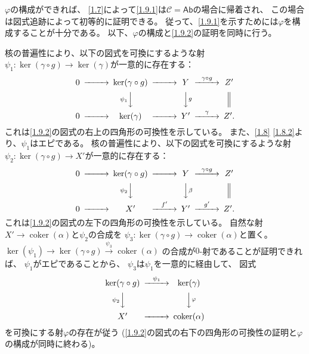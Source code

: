 \documentclass[uplatex,dvipdfmx]{jsarticle}
\makeatletter
\theoremstyle{definition}
\renewenvironment{proof}[1][\proofname]{
  \pushQED{\qed}%
  \normalfont \topsep6\p@\@plus6\p@\relax
  \trivlist
  \item[\hskip\labelsep
    #1\@addpunct{\textbf{.}}]\ignorespaces
}{%
  \popQED\endtrivlist\@endpefalse
}
\providecommand{\proofname}{証明}
\DeclareMathOperator{\coker}{\mathrm{coker}}
\newcommand{\Ab}{\mathsf{Ab}}
\newcommand\mcC{\mathcal{C}}
\makeatother
\begin{document}
\begin{proof}
  \(\varphi\)の構成ができれば、
  \autoref{1.7}によって\ref{1.9.1}は\(\mcC=\Ab\)の場合に帰着され、
  この場合は図式追跡によって初等的に証明できる。
  従って、\ref{1.9.1}を示すためには\(\varphi\)を構成することが十分である。
  以下、\(\varphi\)の構成と\ref{1.9.2}の証明を同時に行う。

  核の普遍性により、以下の図式を可換にするような射
  \(\psi_1:\ker(\gamma \circ g) \to \ker(\gamma)\)が一意的に存在する：
  \[
  \begin{CD}
    0 @>>> \ker(\gamma\circ g) @>>> Y @> \gamma\circ g >> Z' \\
    @. @V \psi_1 VV @VV g V @| \\
    0 @>>> \ker(\gamma) @>>> Y' @> \gamma >> Z'.
  \end{CD}
  \]
  これは\ref{1.9.2}の図式の右上の四角形の可換性を示している。
  また、\autoref{1.8} \ref{1.8.2}より、\(\psi_1\)はエピである。
  核の普遍性により、以下の図式を可換にするような射
  \(\psi_2:\ker(\gamma\circ g) \to X'\)が一意的に存在する：
  \[
  \begin{CD}
    0 @>>> \ker(\gamma\circ g) @>>> Y @> \gamma\circ g >> Z' \\
    @. @V \psi_2 VV @VV \beta V @| \\
    0 @>>> X' @> f' >> Y' @> g' >> Z'.
  \end{CD}
  \]
  これは\ref{1.9.2}の図式の左下の四角形の可換性を示している。
  自然な射\(X'\to \coker(\alpha)\)と\(\psi_2\)の合成を
  \(\psi_3:\ker(\gamma\circ g) \to \coker(\alpha)\)と置く。
  \(\ker(\psi_1) \to \ker(\gamma\circ g) \xrightarrow{\psi_3} \coker(\alpha)\)
  の合成が\(0\)-射であることが証明できれば、
  \(\psi_1\)がエピであることから、
  \(\psi_3\)は\(\psi_1\)を一意的に経由して、
  図式
  \[
  \begin{CD}
    \ker(\gamma\circ g) @> \psi_1 >> \ker(\gamma) \\
    @V \psi_2 VV @VV \varphi V \\
    X' @>>> \coker(\alpha)
  \end{CD}
  \]
  を可換にする射\(\varphi\)の存在が従う
  (\ref{1.9.2}の図式の右下の四角形の可換性の証明と\(\varphi\)の構成が同時に終わる)。


\end{proof}
\end{document}
